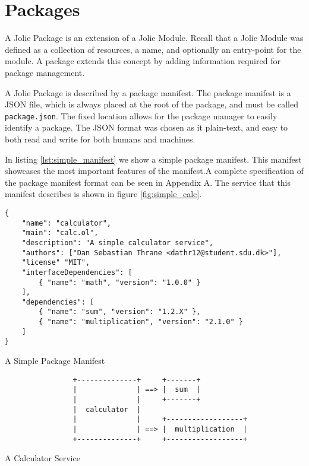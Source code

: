 
\section{Packages}

A Jolie Package is an extension of a Jolie Module. Recall that a Jolie Module
was defined as a collection of resources, a name, and optionally an entry-point
for the module. A package extends this concept by adding information required
for package management. %

A Jolie Package is described by a package manifest. The package manifest is a JSON file, which is always placed at the root of the package, and must be
called \verb!package.json!. The fixed location allows for the package manager
to easily identify a package. The JSON format was chosen as it plain-text, and
easy to both read and write for both humans and machines.

In listing \ref{lst:simple_manifest} we show a simple package manifest. This
manifest showcases the most important features of the manifest.A complete
specification of the package manifest format can be seen in Appendix A. The
service that this manifest describes is shown in figure \ref{fig:simple_calc}.

\begin{listing}[H]
\begin{verbatim}
{
    "name": "calculator",
    "main": "calc.ol",
    "description": "A simple calculator service",
    "authors": ["Dan Sebastian Thrane <dathr12@student.sdu.dk>"],
    "license" "MIT",
    "interfaceDependencies": [
        { "name": "math", "version": "1.0.0" }
    ],
    "dependencies": [
        { "name": "sum", "version": "1.2.X" },
        { "name": "multiplication", "version": "2.1.0" }
    ]
}
\end{verbatim}
\caption{A Simple Package Manifest}
\label{lst:simple_manifest}
\end{listing}

\begin{listing}[H]
\begin{verbatim}
                +--------------+     +-------+
                |              | ==> |  sum  |
                |              |     +-------+
                |  calculator  |
                |              |     +------------------+
                |              | ==> |  multiplication  |
                +--------------+     +------------------+
\end{verbatim}
\caption{A Calculator Service}
\label{fig:simple_calc}
\end{listing}


